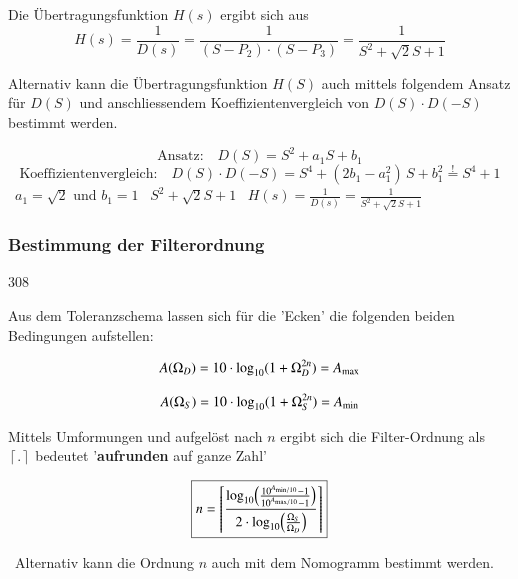 \vspace{0.2cm}
Die Übertragungsfunktion $H(s)$ ergibt sich aus
$$ H(s) = \frac{1}{D(s)} = \frac{1}{(S - P_2) \cdot (S - P_3)} = \frac{1}{S^2 + \sqrt{2} S + 1} $$


Alternativ kann die Übertragungsfunktion $H(S)$ auch mittels folgendem Ansatz für $D(S)$ und anschliessendem Koeffizientenvergleich
von $D(S) \cdot D(-S)$ bestimmt werden.

$$ \text{Ansatz:} \quad  D(S) =  S^2 + a_1 S + b_1 $$
$$ \text{Koeffizientenvergleich:} \quad D(S) \cdot D(-S) = S^4 + (2 b_1 - a_1^2) \, S + b_1^2 \overset{!}{=} S^4 + 1 $$
\textrightarrow\ $a_1 = \sqrt{2}$ und $b_1 = 1$ \quad \textrightarrow\ $S^2 + \sqrt{2} S + 1$ 
\quad \textrightarrow\ $H(s) = \frac{1}{D(s)} = \frac{1}{S^2 + \sqrt{2} S + 1}$


\subsubsection{Bestimmung der Filterordnung}{308}

Aus dem Toleranzschema lassen sich für die 'Ecken' die folgenden beiden Bedingungen aufstellen:

\begin{minipage}[c]{0.48\columnwidth}
    $$ A(\Omega_D) = 10 \cdot \log_{10}(1 + \Omega_D^{2n}) = A_{\rm max} $$
\end{minipage}
\hfill
\begin{minipage}[c]{0.48\columnwidth}
    $$ A(\Omega_S) = 10 \cdot \log_{10}(1 + \Omega_S^{2n}) = A_{\rm min} $$
\end{minipage}

\vspace{0.2cm}
\begin{minipage}[c]{0.48\columnwidth}
    Mittels Umformungen und aufgelöst nach $n$ ergibt sich die Filter-Ordnung als \\
    $\left\lceil . \right\rceil $ bedeutet '\textbf{aufrunden} auf ganze Zahl'
\end{minipage}
\hfill
\begin{minipage}[c]{0.48\columnwidth}
    $$ \boxed{ n =  \left\lceil \frac{\log_{10} \Bigl( \frac{10^{A_{\rm min / 10}} - 1}{10^{A_{\rm max / 10}} - 1}  \Bigr) }
        {2 \cdot \log_{10}\Bigl( \frac{\Omega_S}{\Omega_D} \Bigr)}  \right\rceil } $$
\end{minipage}

\textrightarrow\ Alternativ kann die Ordnung $n$ auch mit dem Nomogramm bestimmt werden.

